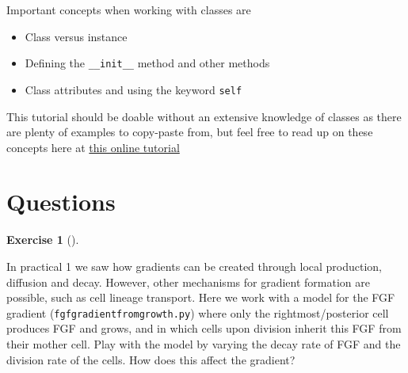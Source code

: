 \documentclass[
  letterpaper,
  DIV=11,
  numbers=noendperiod]{scrreprt}
\providecommand{\tightlist}{%
  \setlength{\itemsep}{0pt}\setlength{\parskip}{0pt}}\usepackage{longtable,booktabs,array}
\theoremstyle{definition}
\newtheorem{exercise}{Exercise}[chapter]
\theoremstyle{remark}
\begin{document}
Important concepts when working with classes are

\begin{itemize}
\tightlist
\item
  Class versus instance
\item
  Defining the \texttt{\_\_init\_\_} method and other methods
\item
  Class attributes and using the keyword \texttt{self}
\end{itemize}

This tutorial should be doable without an extensive knowledge of classes
as there are plenty of examples to copy-paste from, but feel free to
read up on these concepts here at
\href{https://www.datacamp.com/tutorial/python-oop-tutorial}{this online
tutorial}

\section{Questions}\label{questions-1}

\begin{exercise}[]\protect\hypertarget{exr-test}{}\label{exr-test}

In practical 1 we saw how gradients can be created through local
production, diffusion and decay. However, other mechanisms for gradient
formation are possible, such as cell lineage transport. Here we work
with a model for the FGF gradient (\texttt{fgfgradientfromgrowth.py})
where only the rightmost/posterior cell produces FGF and grows, and in
which cells upon division inherit this FGF from their mother cell. Play
with the model by varying the decay rate of FGF and the division rate of
the cells. How does this affect the gradient?

\end{exercise}
\end{document}
